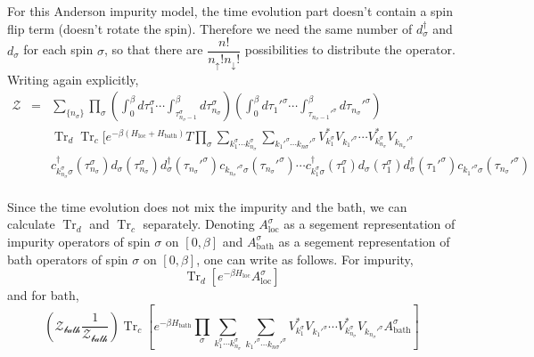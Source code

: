 \documentclass[a4paper]{article}
\DeclareMathOperator{\Tr}{Tr}
\begin{document}
For this Anderson impurity model, the time evolution part doesn't contain a
spin flip term (doesn't rotate the spin). Therefore we need the same number of
$d^{\dagger}_\sigma$ and $d_\sigma$ for each spin $\sigma$, so that there are
$\dfrac{n!}{n_{\uparrow}!n_{\downarrow}!}$ possibilities to distribute the 
operator. Writing again explicitly,
\begin{eqnarray*}
    \mathcal{Z}
        &=& \sum_{\{n_\sigma\}} \prod_{\sigma}
            \left(
                \int_{0}^{\beta}d\tau_{1}^\sigma
                \cdots
                \int_{\tau_{n_{\sigma}-1}^\sigma}^{\beta}
                    d\tau_{n_\sigma}^\sigma
            \right)
            \left(
                \int_{0}^{\beta}d\tau_{1}'^{\sigma}
                \cdots
                \int_{\tau_{n_{\sigma}-1}'^\sigma}^{\beta}
                    d\tau_{n_\sigma}'^\sigma
            \right) \\
        &&  \Tr_{d}\Tr_{c} \Bigg[ 
            e^{-\beta(H_{\text{loc}} + H_{\text{bath}})} T \prod_{\sigma}
            \sum_{k_{1}^{\sigma} \cdots k_{n_\sigma}^{\sigma}}
            \sum_{k_{1}'^{\sigma} \cdots k_{n\sigma}'^{\sigma}}
            V_{k_{1}^{\sigma}}^{*}V_{k_{1}'^{\sigma}} \cdots
            V_{k_{n_{\sigma}}^{\sigma}}^{*}V_{k_{n_{\sigma}}'^{\sigma}} \\
        &&  c_{k_{n_\sigma}^{\sigma}\sigma}^{\dagger} (\tau_{n_\sigma}^\sigma)
            d_{\sigma} (\tau_{n_\sigma}^\sigma)
            d_{\sigma}^{\dagger} (\tau_{n_\sigma}'^\sigma)
            c_{k_{n_\sigma}'^{\sigma}\sigma} (\tau_{n_\sigma}'^\sigma)
            \cdots
            c_{k_{1}^{\sigma}\sigma}^{\dagger} (\tau_{1}^\sigma)
            d_{\sigma} (\tau_{1}^\sigma)
            d_{\sigma}^{\dagger} (\tau_{1}'^\sigma)
            c_{k_{1}'^{\sigma}\sigma} (\tau_{n_\sigma}'^\sigma)\\
\end{eqnarray*}

Since the time evolution does not mix the impurity and the bath, we can 
calculate $\Tr_d$ and $\Tr_c$ separately. Denoting $A^{\sigma}_{\text{loc}}$ as
a segement representation of impurity operators of spin $\sigma$ on $[0,\beta]$
and $A^{\sigma}_{\text{bath}}$ as a segement representation of bath operators of
spin $\sigma$ on $[0,\beta]$, one can write as follows. For impurity,
\begin{equation}
    \Tr_{d} \left[ e^{-\beta H_{\text{loc}}} A^{\sigma}_{\text{loc}} \right]
\end{equation}
and for bath,
\begin{equation}
    \left(\mathcal{Z_{\text{bath}}} \frac{1}{\mathcal{Z_{\text{bath}}}} \right)
    \Tr_{c} \left[
        e^{-\beta H_{\text{bath}}} \prod_{\sigma}
        \sum_{k_{1}^{\sigma} \cdots k_{n_\sigma}^{\sigma}}
        \sum_{k_{1}'^{\sigma} \cdots k_{n\sigma}'^{\sigma}}
        V_{k_{1}^{\sigma}}^{*}V_{k_{1}'^{\sigma}} \cdots
        V_{k_{n_{\sigma}}^{\sigma}}^{*}V_{k_{n_{\sigma}}'^{\sigma}}
        A^{\sigma}_{\text{bath}}
        \right]
\end{equation}
\end{document}

